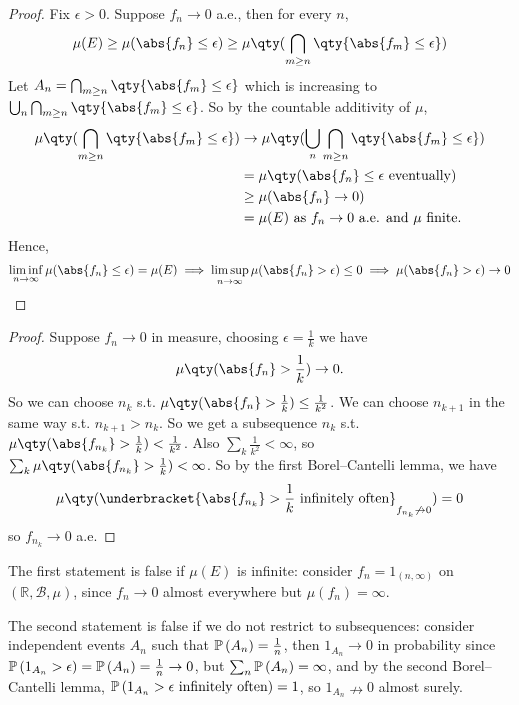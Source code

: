 \begin{proof}
	Fix $\epsilon > 0$.
	Suppose $f_n \to 0$ a.e., then for every $n$,
	\begin{align*}
		\mu(E) \geq \mu(\abs{f_n} \leq \epsilon) \geq \mu\qty(\bigcap_{m \geq n} \qty{\abs{f_m} \leq \epsilon})
	\end{align*}
	Let $A_n = \bigcap_{m \geq n} \qty{\abs{f_m} \leq \epsilon}$ which is increasing to $\bigcup_n \bigcap_{m \geq n} \qty{\abs{f_m} \leq \epsilon}$.
	So by the countable additivity of $\mu$,
	\begin{align*}
		\mu\qty(\bigcap_{m \geq n} \qty{\abs{f_m} \leq \epsilon}) &\to \mu\qty(\bigcup_n \bigcap_{m \geq n} \qty{\abs{f_m} \leq \epsilon}) \\
		&= \mu\qty(\abs{f_n} \leq \epsilon \text{ eventually}) \\
		&\geq \mu(\abs{f_n} \to 0) \\
		&= \mu(E) \text{ as $f_n \to 0$ a.e. and $\mu$ finite.}
	\end{align*}
	Hence,
	\begin{align*}
		\liminf_{n \to \infty} \mu(\abs{f_n} \leq \epsilon) = \mu(E) \implies \limsup_{n \to \infty} \mu(\abs{f_n} > \epsilon) \leq 0 \implies \mu(\abs{f_n} > \epsilon) \to 0
	\end{align*}
\end{proof}

\begin{proof}
	Suppose $f_n \to 0$ in measure, choosing $\epsilon = \frac{1}{k}$ we have
	\begin{align*}
		\mu\qty(\abs{f_n} > \frac{1}{k}) \to 0.
	\end{align*}
	So we can choose $n_k$ s.t. $\mu\qty(\abs{f_n} > \frac{1}{k}) \leq \frac{1}{k^2}$.
	We can choose $n_{k+1}$ in the same way s.t. $n_{k+1} > n_k$.
	So we get a subsequence $n_k$ s.t. $\mu\qty(\abs{f_{n_k}} > \frac{1}{k}) < \frac{1}{k^2}$.
	Also $\sum_k \frac{1}{k^2} < \infty$, so $\sum_k \mu\qty(\abs{f_{n_k}} > \frac{1}{k}) < \infty$.
	So by the first Borel--Cantelli lemma, we have
	\begin{align*}
		\mu\qty(\underbracket{\abs{f_{n_k}} > \frac{1}{k} \text{ infinitely often}}_{f_{n_k} \not\to 0}) = 0
	\end{align*}
	so $f_{n_k} \to 0$ a.e.
\end{proof}

\begin{remark}
	The first statement is false if $\mu(E)$ is infinite: consider $f_n = 1_{(n,\infty)}$ on $(\mathbb R,\mathcal B,\mu)$, since $f_n \to 0$ almost everywhere but $\mu(f_n) = \infty$.

	The second statement is false if we do not restrict to subsequences: consider independent events $A_n$ such that $\mathbb{P}\left({A_n}\right) = \frac{1}{n}$, then $1_{A_n} \to 0$ in probability since $\mathbb{P}\left({1_{A_n} > \epsilon}\right) = \mathbb{P}\left({A_n}\right) = \frac{1}{n} \to 0$, but $\sum_n \mathbb{P}\left({A_n}\right) = \infty$, and by the second Borel--Cantelli lemma, $\mathbb{P}\left({1_{A_n} > \epsilon \text{ infinitely often}}\right) = 1$, so $1_{A_n} \nrightarrow 0$ almost surely.
\end{remark}

